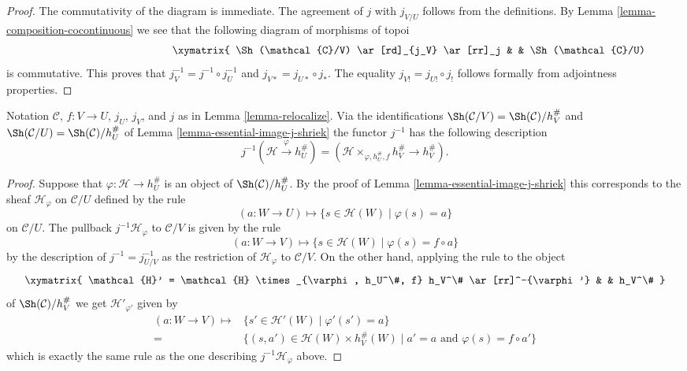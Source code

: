\begin{proof}
The commutativity of the diagram is immediate.
The agreement of $j$ with $j_{V/U}$ follows from the definitions. By
Lemma \ref{lemma-composition-cocontinuous}
we see that the following diagram of morphisms of topoi
\begin{equation}
\label{equation-relocalize}
\vcenter{
\xymatrix{
\Sh(\mathcal{C}/V) \ar[rd]_{j_V} \ar[rr]_j & &
\Sh(\mathcal{C}/U) \ar[ld]^{j_U} \\
& \Sh(\mathcal{C}) &
}
}
\end{equation}
is commutative. This proves that
$j_V^{-1} = j^{-1} \circ j_U^{-1}$ and $j_{V*} = j_{U*} \circ j_*$.
The equality $j_{V!} = j_{U!} \circ j_!$
follows formally from adjointness properties.
\end{proof}

\begin{lemma}
\label{lemma-relocalize-explicit}
Notation $\mathcal{C}$, $f : V \to U$, $j_U$, $j_V$, and $j$ as in
Lemma \ref{lemma-relocalize}.
Via the identifications
$\Sh(\mathcal{C}/V) = \Sh(\mathcal{C})/h_V^\#$
and
$\Sh(\mathcal{C}/U) = \Sh(\mathcal{C})/h_U^\#$
of
Lemma \ref{lemma-essential-image-j-shriek}
the functor $j^{-1}$ has the following description
$$
j^{-1}(\mathcal{H} \xrightarrow{\varphi} h_U^\#)
=
(\mathcal{H} \times_{\varphi, h_U^\#, f} h_V^\# \to h_V^\#).
$$
\end{lemma}

\begin{proof}
Suppose that $\varphi : \mathcal{H} \to h_U^\#$ is an object of
$\Sh(\mathcal{C})/h_U^\#$. By the proof of
Lemma \ref{lemma-essential-image-j-shriek}
this corresponds to the sheaf
$\mathcal{H}_\varphi$ on $\mathcal{C}/U$ defined by the rule
$$
(a : W \to U)
\longmapsto
\{ s \in \mathcal{H}(W) \mid \varphi(s) = a\}
$$
on $\mathcal{C}/U$. The pullback $j^{-1}\mathcal{H}_\varphi$ to
$\mathcal{C}/V$ is given by the rule
$$
(a : W \to V)
\longmapsto
\{ s \in \mathcal{H}(W) \mid \varphi(s) = f \circ a\}
$$
by the description of $j^{-1} = j_{U/V}^{-1}$ as the restriction
of $\mathcal{H}_\varphi$ to $\mathcal{C}/V$.
On the other hand, applying the rule to the object
$$
\xymatrix{
\mathcal{H}' = \mathcal{H} \times_{\varphi, h_U^\#, f} h_V^\#
\ar[rr]^-{\varphi'} & & h_V^\#
}
$$
of $\Sh(\mathcal{C})/h_V^\#$
we get $\mathcal{H}'_{\varphi'}$
given by
\begin{align*}
(a : W \to V)
\longmapsto
&  \{ s' \in \mathcal{H}'(W) \mid \varphi'(s') = a\} \\
= &
\{ (s, a') \in \mathcal{H}(W) \times h_V^\#(W) \mid
a' = a \text{ and } \varphi(s) = f \circ a'\}
\end{align*}
which is exactly the same rule as the one describing
$j^{-1}\mathcal{H}_\varphi$ above.
\end{proof}

